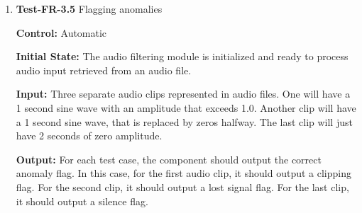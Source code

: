 \documentclass[12pt, titlepage]{article}
\begin{document}
\begin{enumerate}
\textbf{Output:}
Both processing modes should produce equivalent spectrograms for the given audio
input. This means for each frequency in the spectrogram, the amplitude defined
in the hardware-accelerated mode should match the amplitude in the
non-accelerated mode within a defined tolerance of 0.1\%. The hardware
accelerated run should complete at least 50\% faster than the non-accelerated
run.

\textbf{Pass Criteria:}
\begin{itemize}
\item Amplitude error $\leq$ 0.1\% for all frequency bins
\item Hardware-accelerated execution time $\leq$ 0.5 $\times$ non-accelerated execution time
\end{itemize}

\textbf{Test Case Derivation:} 
Hardware acceleration uses specialized processing units to perform expensive
operations, like FFT or convolutions more efficiently than general-purpose.
Verifying the reduced runtime and equivalent outputs confirms the module
deployed on the hardware is functioning correctly. 

\textbf{How test will be performed:}
Manually running one configuration on the microcontroller, and another on the
local computer. Execution time will be measured with a profiler. A test function
will be written to measure the numerical equivalence of both outputs after
processing is completed. Profiler measurements will be manually inspected to
verify that the pass criteria are met (hardware-accelerated execution time is at
least 50\% faster).

\item{\textbf{Test-FR-3.5} Flagging anomalies\\}

\textbf{Control:} Automatic
					
\textbf{Initial State:} 
The audio filtering module is initialized and ready to process audio input
retrieved from an audio file. 
					
\textbf{Input:}
Three separate audio clips represented in audio files. One will have a 1 second
sine wave with an amplitude that exceeds 1.0. Another clip will have a 1 second 
sine wave, that is replaced by zeros halfway. The last clip will just have
2 seconds of zero amplitude.
					
\textbf{Output:}
For each test case, the component should output the correct anomaly flag. In
this case, for the first audio clip, it should output a clipping flag. For the
second clip, it should output a lost signal flag. For the last clip, it should
output a silence flag.


\end{enumerate}
\end{document}
